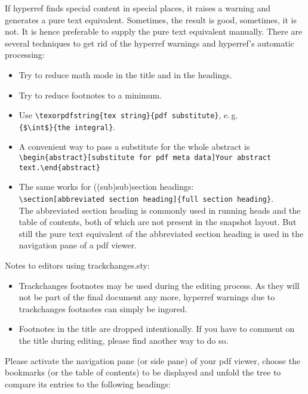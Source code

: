 \documentclass{snapshotmfo}
\begin{document}
If hyperref finds special content in special places, it raises a warning and generates a pure text equivalent. Sometimes, the result is good, sometimes, it is not. It is hence preferable to supply the pure text equivalent manually. There are several techniques to get rid of the hyperref warnings and hyperref's automatic processing:
\begin{itemize}
  \item Try to reduce math mode in the title and in the headings.
  \item Try to reduce footnotes to a minimum.
  \item Use \verb+\texorpdfstring{tex string}{pdf substitute}+, e.\,g.\\ \verb+{$\int$}{the integral}+.
  \item A convenient way to pass a substitute for the whole abstract is\\ \verb+\begin{abstract}[substitute for pdf meta data]Your abstract+\\ \verb+text.\end{abstract}+
  \item The same works for ((sub)sub)section headings:\\ \verb+\section[abbreviated section heading]{full section heading}+.\\ The abbreviated section heading is commonly used in running heads and the table of contents, both of which are not present in the snapshot layout. But still the pure text equivalent of the abbreviated section heading is used in the navigation pane of a pdf viewer.
\end{itemize}

\noindent Notes to editors using trackchanges.sty:
\begin{itemize}
  \item Trackchanges footnotes may be used during the editing process. As they will not be part of the final document any more, hyperref warnings due to trackchanges footnotes can simply be ingored.
  \item Footnotes in the title are dropped intentionally. If you have to comment on the title during editing, please find another way to do so.
\end{itemize}

\noindent Please activate the navigation pane (or side pane) of your pdf viewer, choose the bookmarks (or the table of contents) to be displayed and unfold the tree to compare its entries to the following headings:
\end{document}
